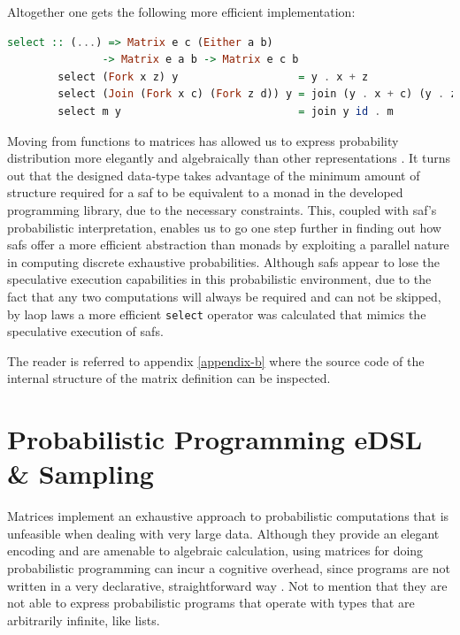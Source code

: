 \documentclass[
  oneside,
  11pt, a4paper,
  footinclude=true,
  headinclude=true,
  cleardoublepage=empty
]{scrbook}
\theoremstyle{definition}
\theoremstyle{definition}
\begin{document}
        \noindent Altogether one gets the following more efficient implementation:
        
        \begin{lstlisting}[language=Haskell, caption={Final result},captionpos=b]
        select :: (...) => Matrix e c (Either a b) 
               -> Matrix e a b -> Matrix e c b
        select (Fork x z) y                   = y . x + z
        select (Join (Fork x c) (Fork z d)) y = join (y . x + c) (y . z + d)
        select m y                            = join y id . m
        \end{lstlisting}{}
        
        Moving from functions to matrices has allowed us to express probability distribution more elegantly and algebraically than other representations \citep{erwig_kollmansberger_2006, kidd2007build}. It turns out that the designed data-type takes advantage of the minimum amount of structure required for a \gls{saf} to be equivalent to a monad in the developed programming library, due to the necessary constraints. This, coupled with \gls{saf}'s probabilistic interpretation, enables us to go one step further in finding out how \glspl{saf} offer a more efficient abstraction than monads by exploiting a parallel nature in computing discrete exhaustive probabilities. Although \glspl{saf} appear to lose the speculative execution capabilities in this probabilistic environment, due to the fact that any two computations will always be required and can not be skipped, by \gls{laop} laws a more efficient \texttt{select} operator was calculated that mimics the speculative execution of \glspl{saf}.
        
        The reader is referred to appendix \ref{appendix-b} where the source code of the internal structure of the matrix definition can be inspected.
        
    \section{Probabilistic Programming eDSL \& Sampling}\label{prob-edsl}
    
    Matrices implement an exhaustive approach to probabilistic computations that is unfeasible when dealing with very large data. Although they provide an elegant encoding and are amenable to algebraic calculation, using matrices for doing probabilistic programming can incur a cognitive overhead, since programs are not written in a very declarative, straightforward way \citep{poll-aop, brusilovsky1994teaching}. Not to mention that they are not able to express probabilistic programs that operate with types that are arbitrarily infinite, like lists.
    
\end{document}
